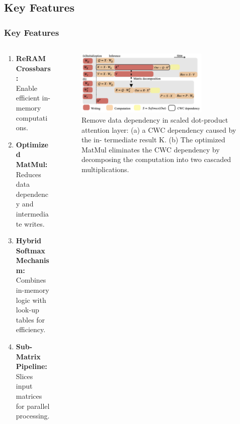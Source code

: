\documentclass[
	12pt, %
]{beamer}
\begin{document}
\subsection{Key Features}
\begin{frame}
	\frametitle{Key Features}
	\begin{columns}
		\begin{column}{0.5\textwidth}
			\begin{enumerate}
				\item 
				\textbf{ReRAM Crossbars:}\\
				Enable efficient in-memory computations.
				
				\item 
				\textbf{Optimized MatMul:}\\ 
				Reduces data dependency and intermediate writes.
				
				\item 
				\textbf{Hybrid Softmax Mechanism:}\\
				Combines in-memory logic with look-up tables for efficiency.

				\item 
				\textbf{Sub-Matrix Pipeline:}\\
				Slices input matrices for parallel processing.
			\end{enumerate}
		\end{column}
		
		\begin{column}{0.5\textwidth}
			\begin{figure}
				\includegraphics[width=6.3cm]{Images/img5.png}
				\caption{Remove data dependency in scaled dot-product
					attention layer: (a) a CWC dependency caused by the in-
					termediate result K. (b) The optimized MatMul eliminates
					the CWC dependency by decomposing the computation into
					two cascaded multiplications.}
			\end{figure}
		\end{column}
	\end{columns}		
\end{frame}
\end{document}
